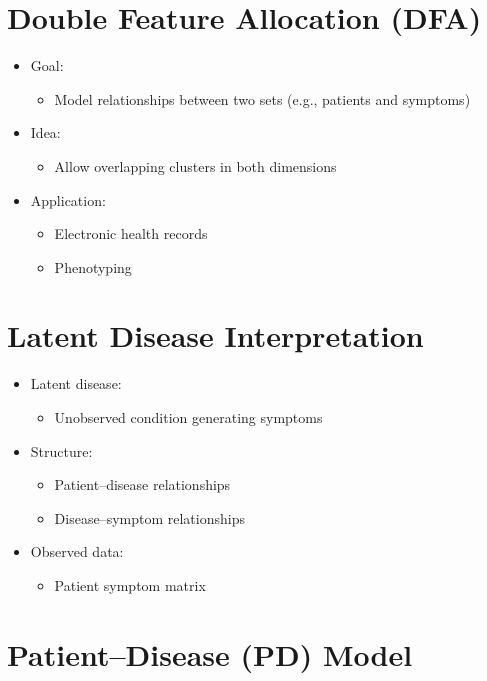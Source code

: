 \documentclass[12pt,oneside]{book}
\numberwithin{equation}{section}
\theoremstyle{definition}
\theoremstyle{plain}
\theoremstyle{remark}
\begin{document}
\section{Double Feature Allocation (DFA)}

\begin{itemize}
\item Goal:
\begin{itemize}
\item Model relationships between two sets (e.g., patients and symptoms)
\end{itemize}

\item Idea:
\begin{itemize}
\item Allow overlapping clusters in both dimensions
\end{itemize}

\item Application:
\begin{itemize}
\item Electronic health records
\item Phenotyping
\end{itemize}
\end{itemize}

\section{Latent Disease Interpretation}

\begin{itemize}
\item Latent disease:
\begin{itemize}
\item Unobserved condition generating symptoms
\end{itemize}

\item Structure:
\begin{itemize}
\item Patient--disease relationships
\item Disease--symptom relationships
\end{itemize}

\item Observed data:
\begin{itemize}
\item Patient symptom matrix
\end{itemize}
\end{itemize}

\section{Patient--Disease (PD) Model}
\end{document}
